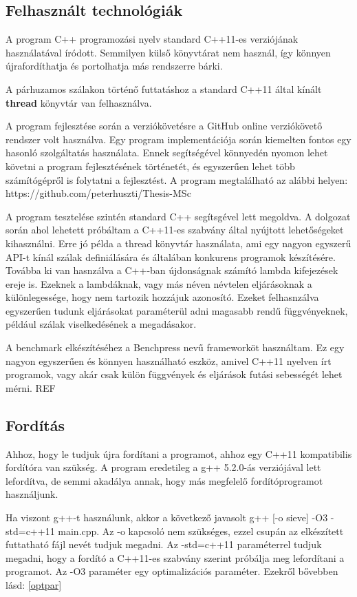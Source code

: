 \documentclass[twoside, a4paper, 12pt]{article}
\begin{document}
\subsection{Felhasznált technológiák}
A program C++ programozási nyelv standard C++11-es verziójának használatával íródott. Semmilyen külső könyvtárat nem használ, így könnyen újrafordíthatja és portolhatja más rendszerre bárki. \par
A párhuzamos szálakon történő futtatáshoz a standard C++11 által kínált \textbf{thread} könyvtár van felhasználva. \par
A program fejlesztése során a verziókövetésre a GitHub online verziókövető rendszer volt használva. Egy program implementációja során kiemelten fontos egy hasonló szolgáltatás használata. Ennek segítségével könnyedén nyomon lehet követni a program fejlesztésének történetét, és egyszerűen lehet több számítógépről is folytatni a fejlesztést. A program megtalálható az alábbi helyen: https://github.com/peterhuszti/Thesis-MSc \par
A program tesztelése szintén standard C++ segítsgével lett megoldva. A dolgozat során ahol lehetett próbáltam a C++11-es szabvány által nyújtott lehetőségeket kihasználni. Erre jó példa a thread könyvtár használata, ami egy nagyon egyszerű API-t kínál szálak definiálására és általában konkurens programok készítésére. Továbba ki van hasnzálva a C++-ban újdonságnak számító lambda kifejezések ereje is. Ezeknek a lambdáknak, vagy más néven névtelen eljárásoknak a különlegessége, hogy nem tartozik hozzájuk azonosító. Ezeket felhasnzálva egyszerűen tudunk eljárásokat paraméterül adni magasabb rendű függvényeknek, például szálak viselkedésének a megadásakor. \par
A benchmark elkészítéséhez a Benchpress nevű frameworköt használtam. Ez egy nagyon egyszerűen és könnyen használható eszköz, amivel C++11 nyelven írt programok, vagy akár csak külön függvények és eljárások futási sebességét lehet mérni. REF \par

\subsection{Fordítás} \label{build}

Ahhoz, hogy le tudjuk újra fordítani a programot, ahhoz egy C++11 kompatibilis fordítóra van szükség. A program eredetileg a g++ 5.2.0-ás verziójával lett lefordítva, de semmi akadálya annak, hogy más megfelelő fordítóprogramot használjunk. \par
Ha viszont g++-t használunk, akkor a következő javasolt g++ [-o sieve] -O3 -std=c++11 main.cpp. Az -o kapcsoló nem szükséges, ezzel csupán az elkészített futtatható fájl nevét tudjuk megadni. Az -std=c++11 paraméterrel tudjuk megadni, hogy a fordító a C++11-es szabvány szerint próbálja meg lefordítani a programot. Az -O3 paraméter egy optimalizációs paraméter. Ezekről bővebben lásd: \ref{optpar}
\end{document}
